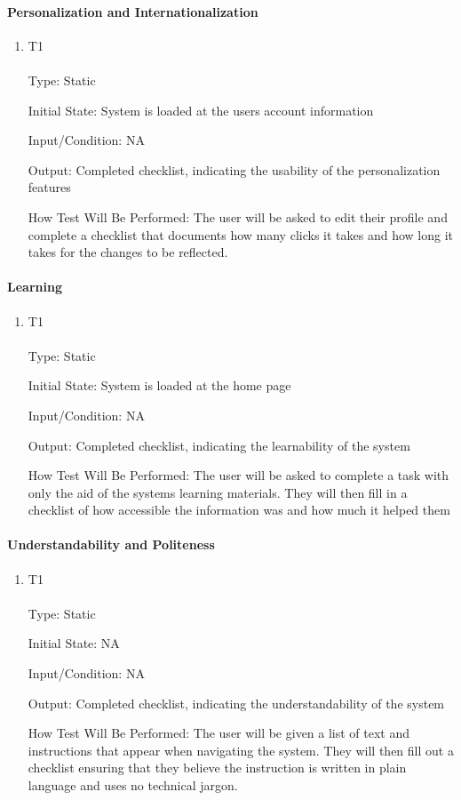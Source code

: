\documentclass[12pt, titlepage]{article}
\begin{document}
\paragraph{Personalization and Internationalization}
\begin{enumerate}
\item {T1\\}\\
Type: Static

Initial State: System is loaded at the users account information

Input/Condition: NA

Output: Completed checklist, indicating the usability of the personalization features

How Test Will Be Performed: The user will be asked to edit their profile and complete a checklist that documents how many clicks it takes and how long it takes for the changes to be reflected.
\end{enumerate}
\paragraph{Learning}
\begin{enumerate}
\item {T1\\}\\
Type: Static

Initial State: System is loaded at the home page

Input/Condition: NA

Output: Completed checklist, indicating the learnability of the system

How Test Will Be Performed: The user will be asked to complete a task with only the aid of the systems learning materials. They will then fill in a checklist of how accessible the information was and how much it helped them
\end{enumerate}
\paragraph{Understandability and Politeness}
\begin{enumerate}
\item {T1\\}\\
Type: Static

Initial State: NA

Input/Condition: NA

Output: Completed checklist, indicating the understandability of the system

How Test Will Be Performed: The user will be given a list of text and instructions that appear when navigating the system. They will then fill out a checklist ensuring that they believe the instruction is written in plain language and uses no technical jargon.
\end{enumerate}
\end{document}
